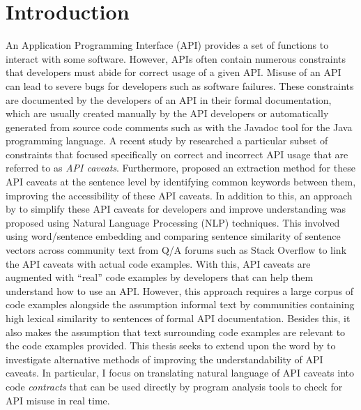 \chapter{Introduction}
\label{cha:intro}

An Application Programming Interface (API) provides a set of functions to interact with some software. However, APIs often contain numerous constraints that developers must abide for correct usage of a given API. Misuse of an API can lead to severe bugs for developers such as software failures. These constraints are documented by the developers of an API in their formal documentation, which are usually created manually by the API developers or automatically generated from source code comments such as with the Javadoc tool for the Java programming language. A recent study by \citeauthor{caveat-knowledge-graph} researched a particular subset of constraints that focused specifically on correct and incorrect API usage that are referred to as \textit{API caveats}. Furthermore, \citeauthor{caveat-knowledge-graph} proposed an extraction method for these API caveats at the sentence level by identifying common keywords between them, improving the accessibility of these API caveats. 
In addition to this, an approach by \citeauthor{jiamou} to simplify these API caveats for developers and improve understanding was proposed using Natural Language Processing (NLP) techniques. This involved using word/sentence embedding and comparing sentence similarity of sentence vectors across community text from Q/A forums such as Stack Overflow to link the API caveats with actual code examples. With this, API caveats are augmented with ``real'' code examples by developers that can help them understand how to use an API. However, this approach requires a large corpus of code examples alongside the assumption informal text by communities containing high lexical similarity to sentences of formal API documentation. Besides this, it also makes the assumption that text surrounding code examples are relevant to the code examples provided.
This thesis seeks to extend upon the word by \citeauthor{caveat-knowledge-graph, jiamou, xiaoxue} to investigate alternative methods of improving the understandability of API caveats. In particular, I focus on translating natural language of API caveats into code \textit{contracts} that can be used directly by program analysis tools to check for API misuse in real time.

